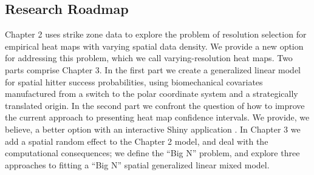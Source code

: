 \documentclass{article}
\begin{document}
\subsection{Research Roadmap}


Chapter 2 uses strike zone data to explore the problem of resolution selection for empirical heat maps with varying spatial data density. We provide a new option for addressing this problem, which we call varying-resolution heat maps. Two parts comprise Chapter 3. In the first part we create a generalized linear model for spatial hitter success probabilities, using biomechanical covariates manufactured from a switch to the polar coordinate system and a strategically translated origin. In the second part we confront the question of how to improve the current approach to presenting heat map confidence intervals. We provide, we believe, a better option with an interactive Shiny application \citep{Shiny}. In Chapter 3 we add a spatial random effect to the Chapter 2 model, and deal with the computational consequences; we define the ``Big N'' problem, and explore three approaches to fitting a ``Big N'' spatial generalized linear mixed model. 



\end{document}
